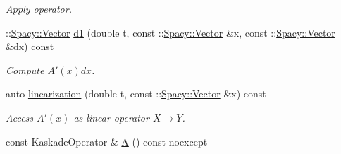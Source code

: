 \begin{DoxyCompactItemize}
\begin{DoxyCompactList}\small\item\em \-Apply operator. \end{DoxyCompactList}\item 
\hypertarget{classSpacy_1_1Kaskade_1_1DynamicC1Operator_a0845a4e92033d9eb31cc9d31e395355d}{\-::\hyperlink{classSpacy_1_1Vector}{\-Spacy\-::\-Vector} \hyperlink{classSpacy_1_1Kaskade_1_1DynamicC1Operator_a0845a4e92033d9eb31cc9d31e395355d}{d1} (double t, const \-::\hyperlink{classSpacy_1_1Vector}{\-Spacy\-::\-Vector} \&x, const \-::\hyperlink{classSpacy_1_1Vector}{\-Spacy\-::\-Vector} \&dx) const }\label{classSpacy_1_1Kaskade_1_1DynamicC1Operator_a0845a4e92033d9eb31cc9d31e395355d}

\begin{DoxyCompactList}\small\item\em \-Compute $A'(x)dx$. \end{DoxyCompactList}\item 
\hypertarget{classSpacy_1_1Kaskade_1_1DynamicC1Operator_a18ee482621e290565ed494ddce1e7322}{auto \hyperlink{classSpacy_1_1Kaskade_1_1DynamicC1Operator_a18ee482621e290565ed494ddce1e7322}{linearization} (double t, const \-::\hyperlink{classSpacy_1_1Vector}{\-Spacy\-::\-Vector} \&x) const }\label{classSpacy_1_1Kaskade_1_1DynamicC1Operator_a18ee482621e290565ed494ddce1e7322}

\begin{DoxyCompactList}\small\item\em \-Access $A'(x)$ as linear operator $X\rightarrow Y$. \end{DoxyCompactList}\item 
\hypertarget{classSpacy_1_1Kaskade_1_1DynamicC1Operator_a763b8ec5c431dc4fe56f7ce010bcd0be}{const \-Kaskade\-Operator \& \hyperlink{classSpacy_1_1Kaskade_1_1DynamicC1Operator_a763b8ec5c431dc4fe56f7ce010bcd0be}{\-A} () const noexcept}\label{classSpacy_1_1Kaskade_1_1DynamicC1Operator_a763b8ec5c431dc4fe56f7ce010bcd0be}


\end{DoxyCompactItemize}
